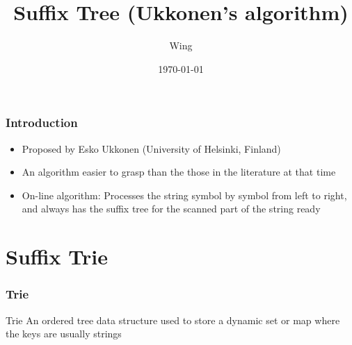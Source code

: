 \documentclass[compress,usenames,dvipsnames]{beamer}
\author{Wing}
\title{Suffix Tree (Ukkonen's algorithm)}
\begin{document}
\date{\today} 

\frame[plain]{\titlepage} %


\begin{frame} \frametitle{Introduction}
    \begin{itemize}
        \item Proposed by Esko Ukkonen (University of Helsinki, Finland)
        \item An algorithm easier to grasp than the those in the literature at that time
        \item On-line algorithm: Processes the string symbol by symbol from left to right, and always has the suffix tree for the scanned
            part of the string ready
    \end{itemize}
\end{frame}

\section{Suffix Trie}
\begin{frame} \frametitle{Trie}
    \begin{block}{Trie}
        An ordered tree data structure used to store a dynamic set or map where the keys are usually strings
    \end{block}
\end{frame}



























\end{document}
